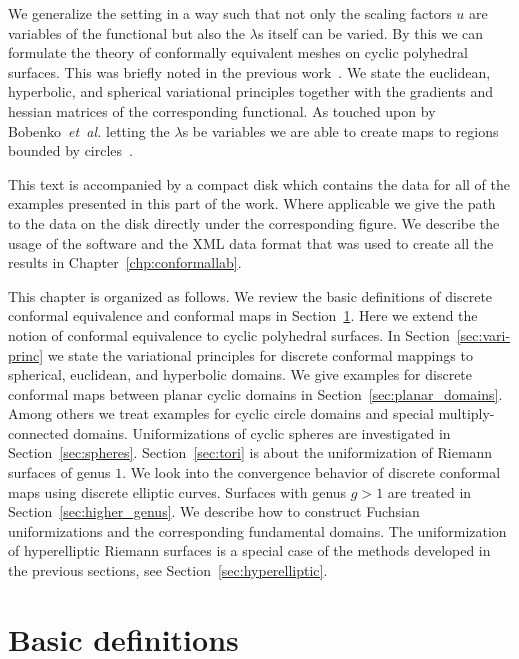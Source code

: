 \documentclass[Thesis]{subfiles}
\begin{document}
We generalize the setting in a way such that not only the scaling factors $u$ are variables of the functional but also the $\lambda$s itself can be varied. 
By this we can formulate the theory of conformally equivalent meshes on cyclic polyhedral surfaces. 
This was briefly noted in the previous work~\cite[p. 2211]{Bobenko2010}.
We state the euclidean, hyperbolic, and spherical variational principles together with the gradients and hessian matrices of the corresponding functional. 
As touched upon by Bobenko~\emph{et~al.} letting the $\lambda$s be variables we are able to create maps to regions bounded by circles~\cite[p. 2212]{Bobenko2010}.

This text is accompanied by a compact disk which contains the data for all of the examples presented in this part of the work. 
Where applicable we give the path to the data on the disk directly under the corresponding figure.
We describe the usage of the software and the XML data format that was used to create all the results in Chapter~\ref{chp:conformallab}.


This chapter is organized as follows. We review the basic definitions of discrete conformal equivalence and conformal maps in Section~\ref{sec:basic_definitions}. Here we extend the notion of conformal equivalence to cyclic polyhedral surfaces.
In Section~\ref{sec:vari-princ} we state the variational principles for discrete conformal mappings to spherical, euclidean, and hyperbolic domains.
We give examples for discrete conformal maps between planar cyclic domains in Section~\ref{sec:planar_domains}. 
Among others we treat examples for cyclic circle domains and special multiply-connected domains.
Uniformizations of cyclic spheres are investigated in Section~\ref{sec:spheres}.
Section~\ref{sec:tori} is about the uniformization of Riemann surfaces of genus $1$.
We look into the convergence behavior of discrete conformal maps using discrete elliptic curves.
 Surfaces with genus $g>1$ are treated in Section~\ref{sec:higher_genus}.
 We describe how to construct Fuchsian uniformizations and the corresponding fundamental domains.
 The uniformization of hyperelliptic Riemann surfaces is a special case of the methods developed in the previous sections, see Section~\ref{sec:hyperelliptic}.
 

\section{Basic definitions}
\label{sec:basic_definitions}
\end{document}
